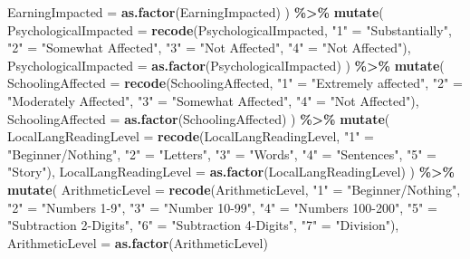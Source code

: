 \documentclass[
]{article}
\newenvironment{Shaded}{\begin{snugshade}}{\end{snugshade}}
\newcommand{\AttributeTok}[1]{\textcolor[rgb]{0.13,0.29,0.53}{#1}}
\newcommand{\FunctionTok}[1]{\textcolor[rgb]{0.13,0.29,0.53}{\textbf{#1}}}
\newcommand{\NormalTok}[1]{#1}
\newcommand{\OtherTok}[1]{\textcolor[rgb]{0.56,0.35,0.01}{#1}}
\newcommand{\SpecialCharTok}[1]{\textcolor[rgb]{0.81,0.36,0.00}{\textbf{#1}}}
\newcommand{\StringTok}[1]{\textcolor[rgb]{0.31,0.60,0.02}{#1}}
\begin{document}
\begin{Shaded}
\begin{Highlighting}[]
    \AttributeTok{EarningImpacted =} \FunctionTok{as.factor}\NormalTok{(EarningImpacted)}
\NormalTok{  ) }\SpecialCharTok{\%\textgreater{}\%}
  \FunctionTok{mutate}\NormalTok{(}
    \AttributeTok{PsychologicalImpacted =} \FunctionTok{recode}\NormalTok{(PsychologicalImpacted, }\StringTok{"1"} \OtherTok{=} \StringTok{"Substantially"}\NormalTok{, }\StringTok{"2"} \OtherTok{=} \StringTok{"Somewhat Affected"}\NormalTok{, }\StringTok{"3"} \OtherTok{=} \StringTok{"Not Affected"}\NormalTok{, }\StringTok{"4"} \OtherTok{=} \StringTok{"Not Affected"}\NormalTok{),}
    \AttributeTok{PsychologicalImpacted =} \FunctionTok{as.factor}\NormalTok{(PsychologicalImpacted)}
\NormalTok{  ) }\SpecialCharTok{\%\textgreater{}\%}
  \FunctionTok{mutate}\NormalTok{(}
    \AttributeTok{SchoolingAffected =} \FunctionTok{recode}\NormalTok{(SchoolingAffected, }\StringTok{"1"} \OtherTok{=} \StringTok{"Extremely affected"}\NormalTok{, }\StringTok{"2"} \OtherTok{=} \StringTok{"Moderately Affected"}\NormalTok{, }\StringTok{"3"} \OtherTok{=} \StringTok{"Somewhat Affected"}\NormalTok{, }\StringTok{"4"} \OtherTok{=} \StringTok{"Not Affected"}\NormalTok{),}
    \AttributeTok{SchoolingAffected =} \FunctionTok{as.factor}\NormalTok{(SchoolingAffected)}
\NormalTok{  ) }\SpecialCharTok{\%\textgreater{}\%}
  \FunctionTok{mutate}\NormalTok{(}
    \AttributeTok{LocalLangReadingLevel =} \FunctionTok{recode}\NormalTok{(LocalLangReadingLevel, }\StringTok{"1"} \OtherTok{=} \StringTok{"Beginner/Nothing"}\NormalTok{, }\StringTok{"2"} \OtherTok{=} \StringTok{"Letters"}\NormalTok{, }\StringTok{"3"} \OtherTok{=} \StringTok{"Words"}\NormalTok{, }\StringTok{"4"} \OtherTok{=} \StringTok{"Sentences"}\NormalTok{, }\StringTok{"5"} \OtherTok{=} \StringTok{"Story"}\NormalTok{),}
    \AttributeTok{LocalLangReadingLevel =} \FunctionTok{as.factor}\NormalTok{(LocalLangReadingLevel)}
\NormalTok{  ) }\SpecialCharTok{\%\textgreater{}\%}
  \FunctionTok{mutate}\NormalTok{(}
    \AttributeTok{ArithmeticLevel =} \FunctionTok{recode}\NormalTok{(ArithmeticLevel, }\StringTok{"1"} \OtherTok{=} \StringTok{"Beginner/Nothing"}\NormalTok{, }\StringTok{"2"} \OtherTok{=} \StringTok{"Numbers 1{-}9"}\NormalTok{, }\StringTok{"3"} \OtherTok{=} \StringTok{"Number 10{-}99"}\NormalTok{, }\StringTok{"4"} \OtherTok{=} \StringTok{"Numbers 100{-}200"}\NormalTok{, }\StringTok{"5"} \OtherTok{=} \StringTok{"Subtraction 2{-}Digits"}\NormalTok{, }\StringTok{"6"} \OtherTok{=} \StringTok{"Subtraction 4{-}Digits"}\NormalTok{, }\StringTok{"7"} \OtherTok{=} \StringTok{"Division"}\NormalTok{),}
    \AttributeTok{ArithmeticLevel =} \FunctionTok{as.factor}\NormalTok{(ArithmeticLevel)}

\end{Highlighting}
\end{Shaded}
\end{document}
